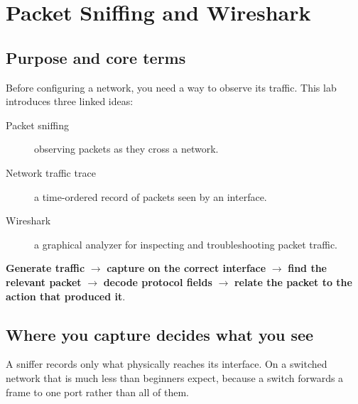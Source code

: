 \chapter{Packet Sniffing and Wireshark}\label{ch:wireshark}

\section{Purpose and core terms}
Before configuring a network, you need a way to observe its traffic. This lab introduces three linked ideas:
\begin{description}
  \item[Packet sniffing] observing packets as they cross a network.
  \item[Network traffic trace] a time-ordered record of packets seen by an interface.
  \item[Wireshark] a graphical analyzer for inspecting and troubleshooting packet traffic.
\end{description}

\begin{conceptmap}
\textbf{Generate traffic} $\rightarrow$ \textbf{capture on the correct interface} $\rightarrow$ \textbf{find the relevant packet} $\rightarrow$ \textbf{decode protocol fields} $\rightarrow$ \textbf{relate the packet to the action that produced it}.
\end{conceptmap}


\section{Where you capture decides what you see}
A sniffer records only what physically reaches its interface. On a
switched network that is much less than beginners expect, because a
switch forwards a frame to one port rather than all of them.

